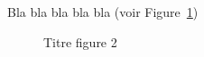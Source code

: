 Bla bla bla bla bla (voir Figure~\ref{fig:Nature})
\begin{figure}[ht]
	\centering
	\vspace*{13pt}
	\caption{Titre figure 2} 
	\label{fig:Nature}
\end{figure} 


